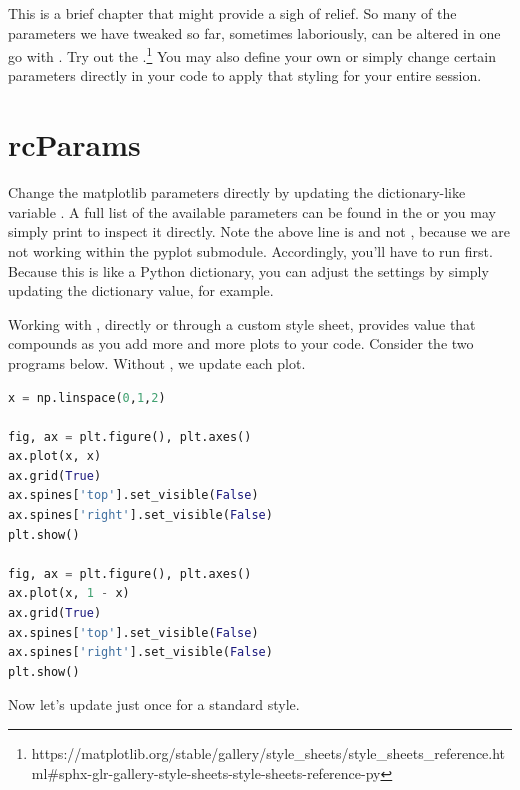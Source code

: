 This is a brief chapter that might provide a sigh of relief. So many of the parameters we have tweaked so far, sometimes laboriously, can be altered in one go with . Try out the .\footnote{https://matplotlib.org/stable/gallery/style\_sheets/style\_sheets\_reference.html\#sphx-glr-gallery-style-sheets-style-sheets-reference-py} You may also define your own or simply change certain parameters directly in your code to apply that styling for your entire session. 

\section{rcParams}

Change the matplotlib parameters directly by updating the dictionary-like variable . A full list of the available parameters can be found in the   or you may simply print  to inspect it directly. Note the above line is  and not , because we are not working within the pyplot submodule. Accordingly, you'll have to run  first. Because this is like a Python dictionary, you can adjust the settings by simply updating the dictionary value,  for example. 

Working with , directly or through a custom style sheet, provides value that compounds as you add more and more plots to your code.  Consider the two programs below. Without , we update each plot.

\begin{lstlisting}[language = Python]
x = np.linspace(0,1,2)

fig, ax = plt.figure(), plt.axes()
ax.plot(x, x)
ax.grid(True)
ax.spines['top'].set_visible(False)
ax.spines['right'].set_visible(False)
plt.show()

fig, ax = plt.figure(), plt.axes()
ax.plot(x, 1 - x)
ax.grid(True)
ax.spines['top'].set_visible(False)
ax.spines['right'].set_visible(False)
plt.show()
\end{lstlisting}

\vspace{-0.3cm}
Now let's update  just once for a standard style.

